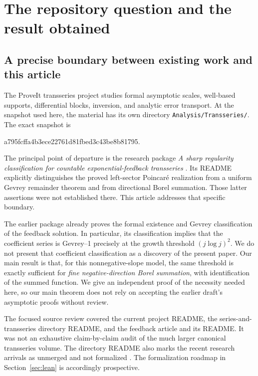 \documentclass[11pt,a4paper]{article}
\numberwithin{equation}{section}
\theoremstyle{definition}
\theoremstyle{remark}
\begin{document}
\clearpage
\setcounter{tocdepth}{1}
\hypersetup{bookmarksdepth=2}
\tableofcontents
\clearpage

\section{The repository question and the result obtained}
\label{sec:context}

\subsection{A precise boundary between existing work and this article}
The ProveIt transseries project studies formal asymptotic scales, well-based
supports, differential blocks, inversion, and analytic error transport.  At the
snapshot used here, the material has its own directory
\texttt{Analysis/Transseries/}.  The exact snapshot is
\begin{center}\small\ttfamily
a795fcffa4b3ece22761d81fbed3c43be8b81795.
\end{center}
The principal point of departure is the research package
\emph{A sharp regularity classification for countable exponential-feedback
transseries} \cite{feedback}.  Its README explicitly distinguishes the proved
left-sector Poincar\'e realization from a uniform Gevrey remainder theorem and
from directional Borel summation.  Those latter assertions were not established
there.  This article addresses that specific boundary.

The earlier package already proves the formal existence and Gevrey
classification of the feedback solution.  In particular, its classification
implies that the coefficient series is Gevrey--1 precisely at the growth
threshold $(j\log j)^2$.  We do not present that coefficient classification
as a discovery of the present paper.  Our main result is that, for this
nonnegative-slope model, the same threshold is exactly sufficient for
\emph{fine negative-direction Borel summation}, with identification of the
summed function.  We give an independent proof of the necessity needed here,
so our main theorem does not rely on accepting the earlier draft's asymptotic
proofs without review.

The focused source review covered the current project README, the
series-and-transseries directory README, and the feedback article and its
README.  It was not an exhaustive claim-by-claim audit of the much larger
canonical transseries volume.  The directory README also marks the recent
research arrivals as unmerged and not formalized \cite{project}.  The
formalization roadmap in Section~\ref{sec:lean} is accordingly prospective.
\end{document}
